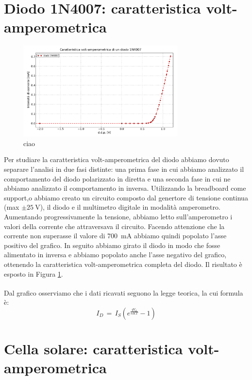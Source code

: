 \section{Diodo 1N4007: caratteristica volt-amperometrica}

\begin{figure}
	\caption{ciao}
	\label{fig:diodo}
	\includegraphics[width=0.75\textwidth]{diodo.pdf}
\end{figure}

Per studiare la caratteristica volt-amperometrica del diodo abbiamo dovuto separare l'analisi in due fasi distinte: una prima fase in cui abbiamo analizzato il comportamento del diodo polarizzato in diretta e una seconda fase in cui ne abbiamo analizzato il comportamento in inversa.
Utilizzando la breadboard come support,o abbiamo creato un circuito composto dal genertore di tensione continua (max $\pm \SI{25}{\volt}$), il diodo e il multimetro digitale in modalità amperometro. Aumentando progressivamente la tensione, abbiamo letto sull'amperometro i valori della corrente che attraversava il circuito.
Facendo attenzione che la corrente non superasse il valore di \SI{700}{\milli\ampere} abbiamo quindi popolato l'asse positivo del grafico. In seguito abbiamo girato il diodo in modo che fosse alimentato in inversa e abbiamo popolato anche l'asse negativo del grafico, ottenendo la caratteristica volt-amperometrica completa del diodo. Il risultato è esposto in Figura \ref{fig:diodo}.
\\
\\
Dal grafico osserviamo che i dati ricavati seguono la legge teorica, la cui formula è:
\begin{equation}
I_{D} \, = \, I_{S} \left( e^{\frac{q V_d}{nKT}} -1 \right)
\label{eq:diode}
\end{equation}

\section{Cella solare: caratteristica volt-amperometrica}

